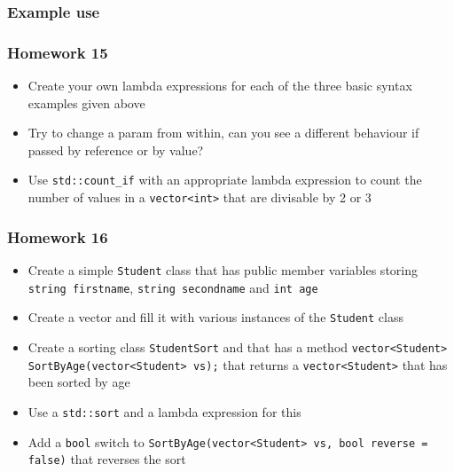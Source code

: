 \subsubsection{Example use}\label{example-use}

\begin{Shaded}
\end{Shaded}

\subsubsection{Homework 15}\label{homework-15}

\begin{itemize}
\itemsep1pt\parskip0pt
\item
  Create your own lambda expressions for each of the three basic syntax
  examples given above
\item
  Try to change a param from within, can you see a different behaviour
  if passed by reference or by value?
\item
  Use \texttt{std::count\_if} with an appropriate lambda expression to
  count the number of values in a
  \texttt{vector\textless{}int\textgreater{}} that are divisable by 2 or
  3
\end{itemize}

\subsubsection{Homework 16}\label{homework-16}

\begin{itemize}
\itemsep1pt\parskip0pt
\item
  Create a simple \texttt{Student} class that has public member
  variables storing \texttt{string firstname},
  \texttt{string secondname} and \texttt{int age}
\item
  Create a vector and fill it with various instances of the
  \texttt{Student} class
\item
  Create a sorting class \texttt{StudentSort} and that has a method
  \texttt{vector\textless{}Student\textgreater{} SortByAge(vector\textless{}Student\textgreater{} vs);}
  that returns a \texttt{vector\textless{}Student\textgreater{}} that
  has been sorted by age
\item
  Use a \texttt{std::sort} and a lambda expression for this
\item
  Add a \texttt{bool} switch to
  \texttt{SortByAge(vector\textless{}Student\textgreater{} vs, bool reverse = false)}
  that reverses the sort
\end{itemize}

